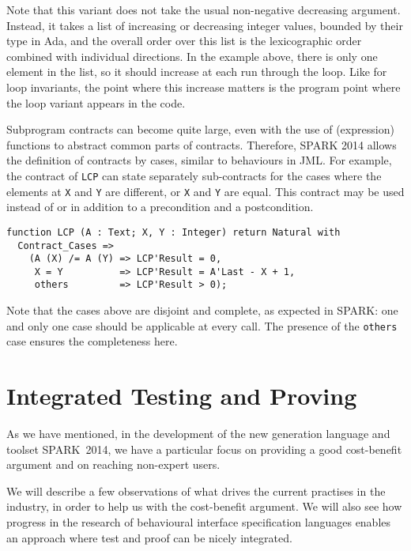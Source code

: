 \documentclass[sttt,draft]{svjour}
\newcommand{\newspark}{SPARK~2014\xspace}
\begin{document}
Note that this variant does not take the usual non-negative decreasing
argument. Instead, it takes a list of increasing or decreasing integer values,
bounded by their type in Ada, and the overall order over this list is the
lexicographic order combined with individual directions. In the example above,
there is only one element in the list, so it should increase at each run
through the loop. Like for loop invariants, the point where this increase
matters is the program point where the loop variant appears in the code.

Subprogram contracts can become quite large, even with the use of (expression)
functions to abstract common parts of contracts. Therefore, SPARK 2014 allows
the definition of contracts by cases, similar to behaviours in
JML\cite{JML}. For example, the contract of \verb|LCP| can state separately
sub-contracts for the cases where the elements at \verb|X| and \verb|Y| are
different, or \verb|X| and \verb|Y| are equal. This contract may be used
instead of or in addition to a precondition and a postcondition.

\begin{footnotesize}
\begin{verbatim}
function LCP (A : Text; X, Y : Integer) return Natural with
  Contract_Cases =>
    (A (X) /= A (Y) => LCP'Result = 0,
     X = Y          => LCP'Result = A'Last - X + 1,
     others         => LCP'Result > 0);
\end{verbatim}
\end{footnotesize}

Note that the cases above are disjoint and complete, as expected in SPARK: one
and only one case should be applicable at every call. The presence of the
\verb|others| case ensures the completeness here.

\section{Integrated Testing and Proving}
\label{hilite}
As we have mentioned, in the development of the new generation
language and toolset \newspark, we have a particular focus on
providing a good cost-benefit argument and on reaching non-expert
users.

We will describe a few observations of what drives the current
practises in the industry, in order to help us with the cost-benefit
argument. We will also see how progress in the research of behavioural
interface specification languages \cite{HatcliffLLMP12} enables an
approach where test and proof can be nicely integrated.
\end{document}
